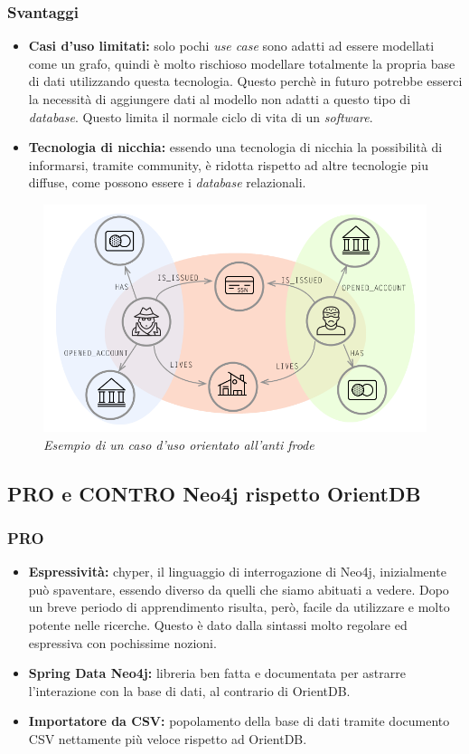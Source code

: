 \subsubsection{Svantaggi}
\begin{itemize}
\item{\textbf{Casi d'uso limitati:}} solo pochi \textit{use case} sono adatti ad essere modellati come un grafo, quindi è molto rischioso modellare totalmente la propria base di dati utilizzando questa tecnologia. Questo perchè in futuro potrebbe esserci la necessità di aggiungere dati al modello non adatti a questo tipo di \textit{database}. Questo limita il normale ciclo di vita di un \textit{software}.
\item{\textbf{Tecnologia di nicchia:}} essendo una tecnologia di nicchia la possibilità di informarsi, tramite community, è ridotta rispetto ad altre tecnologie piu diffuse, come possono essere i \textit{database} relazionali.
\end{itemize}
\begin{figure}[!ht]
	\centering
	\includegraphics[scale=0.33]{immagini/fraud.png}
	\caption{\textit{Esempio di un caso d'uso orientato all'anti frode }}
\end{figure}


\subsection{PRO e CONTRO Neo4j rispetto OrientDB}
\subsubsection{PRO}
\begin{itemize}
\item{\textbf{Espressività:}} chyper, il linguaggio di interrogazione di Neo4j, inizialmente può spaventare, essendo diverso da quelli che siamo abituati a vedere. Dopo un breve periodo di apprendimento risulta, però, facile da utilizzare e molto potente nelle ricerche. Questo è dato dalla sintassi molto regolare ed espressiva con pochissime nozioni.
\item{\textbf{Spring Data Neo4j:}} libreria ben fatta e documentata per astrarre l'interazione con la base di dati, al contrario di OrientDB.
\item{\textbf{Importatore da CSV:}} popolamento della base di dati tramite documento CSV nettamente più veloce rispetto ad OrientDB.
\end{itemize}
